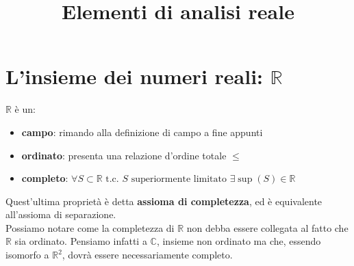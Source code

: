 \documentclass{article}
\begin{document}
\title{Elementi di analisi reale}
\maketitle
\section{L'insieme dei numeri reali: $\mathbb{R}$}
    $\mathbb{R}$ è un:
    \begin{itemize}
        \item \textbf{campo}: rimando alla definizione di campo a fine appunti
        \item \textbf{ordinato}: presenta una relazione d'ordine totale $\leq$
        \item \textbf{completo}: $\forall S \subset \mathbb{R} \textrm{ t.c. } S 
            \textrm{ superiormente limitato } \exists\sup\left(S\right) \in \mathbb{R}$
    \end{itemize}
    Quest'ultima proprietà è detta \textbf{assioma di completezza}, ed è equivalente 
    all'assioma di separazione. \\
    Possiamo notare come la completezza di $\mathbb{R}$ non debba essere collegata al 
    fatto che $\mathbb{R}$ sia ordinato. Pensiamo infatti a $\mathbb{C}$, insieme non 
    ordinato ma che, essendo isomorfo a $\mathbb{R}^2$, dovrà essere necessariamente completo.
\end{document}
